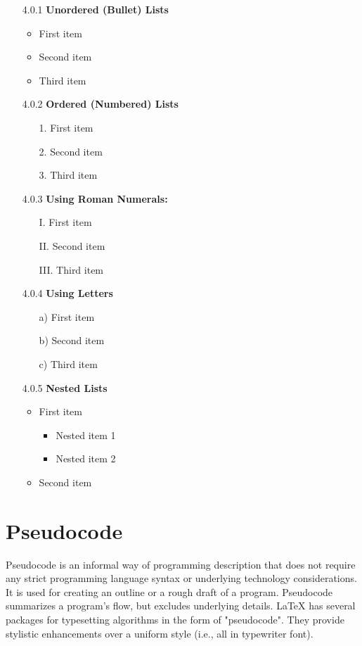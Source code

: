 \documentclass[12pt,a4paper]{article}
\begin{document}
	\begin{enumerate}
		\item[4.0.1]\textbf{Unordered (Bullet) Lists}
		\begin{itemize}
			\item First item
			\item Second item
			\item Third item
		\end{itemize}
		\item[4.0.2]\textbf{Ordered (Numbered) Lists}
		\begin{enumerate}
			\item[1.] First item
			\item[2.] Second item
			\item[3.] Third item
		\end{enumerate}
		
		\item[4.0.3] \textbf{Using Roman Numerals:}
		\begin{enumerate}
			\item[I.] First item
			\item[II.] Second item
			\item[III.] Third item
		\end{enumerate}
		
		\item[4.0.4]\textbf{Using Letters}
		\begin{enumerate}
			\item[a)] First item
			\item[b)] Second item
			\item[c)] Third item
		\end{enumerate}
		\item[4.0.5]\textbf{Nested Lists}
		\begin{itemize}
			\item First item
			\begin{itemize}
				\item Nested item 1
				\item Nested item 2
			\end{itemize}
			\item Second item
		\end{itemize}
	\end{enumerate}
	\section{Pseudocode}
	Pseudocode is an informal way of programming description that does not require any strict programming language syntax or underlying technology considerations. It is used for creating an outline or a rough draft of a program. Pseudocode summarizes a program’s flow, but excludes underlying details. LaTeX has several packages for typesetting algorithms in the form of "pseudocode". They provide stylistic enhancements over a uniform style (i.e., all in typewriter font).
	
\end{document}

